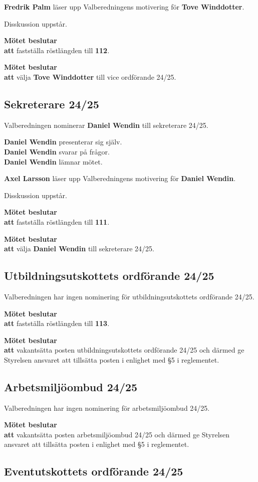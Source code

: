 \documentclass{datateknologsektionen-document}
\newcommand{\ind}{\hspace*{2em}}
\newcommand{\motetbeslutar}{\textbf{Mötet beslutar}}
\newcommand{\att}{\\\ind\textbf{att}}
\newcommand{\rostlangd}[1]{\motetbeslutar\att{} fastställa röstlängden till \textbf{#1}.}
\begin{document}
\textbf{Fredrik Palm} läser upp Valberedningens motivering för \textbf{Tove Winddotter}.

Disskussion uppstår.

\rostlangd{112}

\motetbeslutar\att{} välja \textbf{Tove Winddotter} till vice ordförande 24/25.

\subsection{Sekreterare 24/25}

Valberedningen nominerar \textbf{Daniel Wendin} till sekreterare 24/25.

\textbf{Daniel Wendin} presenterar sig själv.\\
\textbf{Daniel Wendin} svarar på frågor.\\
\textbf{Daniel Wendin} lämnar mötet.

\textbf{Axel Larsson} läser upp Valberedningens motivering för \textbf{Daniel Wendin}.

Disskussion uppstår.

\rostlangd{111}

\motetbeslutar\att{} välja \textbf{Daniel Wendin} till sekreterare 24/25.

\subsection{Utbildningsutskottets ordförande 24/25}

Valberedningen har ingen nominering för utbildningsutskottets ordförande 24/25.

\rostlangd{113}

\motetbeslutar\att{} vakantsätta posten utbildningsutskottets ordförande 24/25 och därmed ge Styrelsen ansvaret att tillsätta posten i enlighet med §5 i reglementet.

\subsection{Arbetsmiljöombud 24/25}

Valberedningen har ingen nominering för arbetsmiljöombud 24/25.

\motetbeslutar\att{} vakantsätta posten arbetsmiljöombud 24/25 och därmed ge Styrelsen ansvaret att tillsätta posten i enlighet med §5 i reglementet.

\subsection{Eventutskottets ordförande 24/25}
\end{document}
